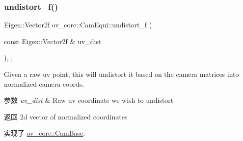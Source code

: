 \subsubsection{\texorpdfstring{undistort\+\_\+f()}{undistort\_f()}}
{\footnotesize\ttfamily Eigen\+::\+Vector2f ov\+\_\+core\+::\+Cam\+Equi\+::undistort\+\_\+f (\begin{DoxyParamCaption}\item[{const Eigen\+::\+Vector2f \&}]{uv\+\_\+dist }\end{DoxyParamCaption})\hspace{0.3cm}{\ttfamily [inline]}, {\ttfamily [override]}, {\ttfamily [virtual]}}



Given a raw uv point, this will undistort it based on the camera matrices into normalized camera coords. 


\begin{DoxyParams}{参数}
{\em uv\+\_\+dist} & Raw uv coordinate we wish to undistort \\
\hline
\end{DoxyParams}
\begin{DoxyReturn}{返回}
2d vector of normalized coordinates 
\end{DoxyReturn}


实现了 \hyperlink{classov__core_1_1CamBase_ad0db03f97e5a12f5ad757f72e60f50e4}{ov\+\_\+core\+::\+Cam\+Base}.

